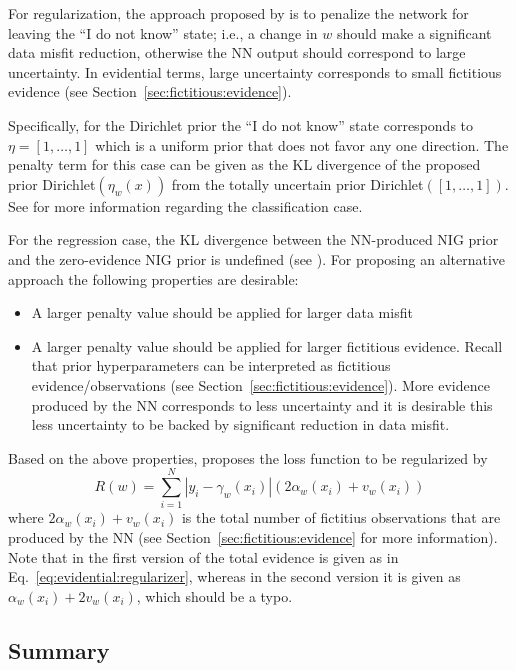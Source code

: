 For regularization, the approach proposed by \textcite{sensoy2018evidential} is to penalize the network for leaving the ``I do not know'' state; i.e., a change in $w$ should make a significant data misfit reduction, otherwise the NN output should correspond to large uncertainty. 
In evidential terms, large uncertainty corresponds to small fictitious evidence (see Section~\ref{sec:fictitious:evidence}). 

Specifically, for the Dirichlet prior the ``I do not know'' state corresponds to $\eta = [1, \dots, 1]$ which is a uniform prior that does not favor any one direction.
The penalty term for this case can be given as the KL divergence of the proposed prior Dirichlet$(\eta_w(x))$ from the totally uncertain prior Dirichlet$([1, \dots, 1])$. 
See \textcite{sensoy2018evidential} for more information regarding the classification case.

For the regression case, the KL divergence between the NN-produced NIG prior and the zero-evidence NIG prior is undefined (see \cite{amini2020deep}).
For proposing an alternative approach the following properties are desirable:
\begin{itemize}
	\item A larger penalty value should be applied for larger data misfit
	\item A larger penalty value should be applied for larger fictitious evidence. Recall that prior hyperparameters can be interpreted as fictitious evidence/observations (see Section~\ref{sec:fictitious:evidence}). 
	More evidence produced by the NN corresponds to less uncertainty and it is desirable this less uncertainty to be backed by significant reduction in data misfit.
\end{itemize} 
Based on the above properties, \textcite{amini2020deep} proposes the loss function to be regularized by 
\begin{equation}\label{eq:evidential:regularizer}
	R(w) = \sum_{i=1}^{N}|y_i-\gamma_w(x_i)|(2\alpha_w(x_i) + v_w(x_i))
\end{equation}
where $2\alpha_w(x_i) + v_w(x_i)$ is the total number of fictitius observations that are produced by the NN (see Section~\ref{sec:fictitious:evidence} for more information).
Note that in the first version of \textcite{amini2020deep} the total evidence is given as in Eq.~\eqref{eq:evidential:regularizer}, whereas in the second version it is given as $\alpha_w(x_i) + 2v_w(x_i)$, which should be a typo.

\subsection{Summary}

